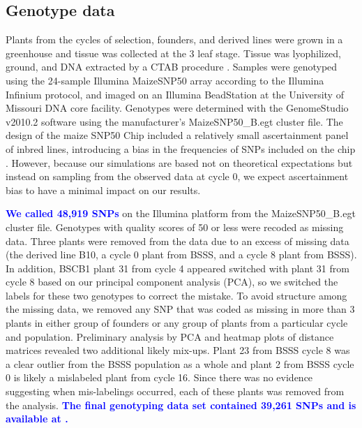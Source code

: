 \documentclass[twocolumn,twoside,letterpaper]{article}
\newcommand{\jri}[1]{\todo[size=\scriptsize, color=flame]{#1}}
\newcommand{\rev}[1]{\textcolor{blue}{\bf #1}}
\begin{document}
\subsection*{Genotype data}
Plants from the cycles of selection, founders, and derived lines were grown in a greenhouse and tissue was collected at the 3 leaf stage. 
Tissue was lyophilized, ground, and DNA extracted by a CTAB procedure \citep{saghai-maroof1984ribosomal}. 
Samples were genotyped using the 24-sample Illumina MaizeSNP50 array \citep{ganal2011a-large} according to the Illumina Infinium protocol, and imaged on an Illumina BeadStation at the University of Missouri DNA core facility. 
Genotypes were determined with the GenomeStudio v2010.2 software using the manufacturer's MaizeSNP50\_B.egt cluster file. 
The design of the maize SNP50 Chip included a relatively small ascertainment panel of inbred lines, introducing a bias in the frequencies of SNPs included on the chip \citep{ganal2011a-large}. 
However, because our simulations are based not on theoretical expectations but instead on sampling from the observed data at cycle 0, we expect ascertainment bias to have a minimal impact on our results. 

\rev{We called 48,919 SNPs} on the Illumina platform from the MaizeSNP50\_B.egt cluster file. Genotypes with quality scores of 50 or less were recoded as missing data. 
Three plants were removed from the data due to an excess of missing data (the derived line B10, a cycle 0 plant from BSSS, and a cycle 8 plant from BSSS). 
In addition, BSCB1 plant 31 from cycle 4 appeared switched with plant 31 from cycle 8 based on our principal component analysis (PCA), so we switched the labels for these two genotypes to correct the mistake. 
To avoid structure among the missing data, we removed any SNP that was coded as missing in more than 3 plants in either group of founders or any group of plants from a particular cycle and population. 
Preliminary analysis by PCA and heatmap plots of distance matrices revealed two additional likely mix-ups. 
Plant 23 from BSSS cycle 8 was a clear outlier from the BSSS population as a whole and plant 2 from BSSS cycle 0 is likely a mislabeled plant from cycle 16. Since there was no evidence suggesting when mis-labelings occurred, each of these plants was removed from the analysis.
\rev{The final genotyping data set contained 39,261 SNPs and is available at .} \jri{Justin, please send me this and I can put online}
	
\end{document}

